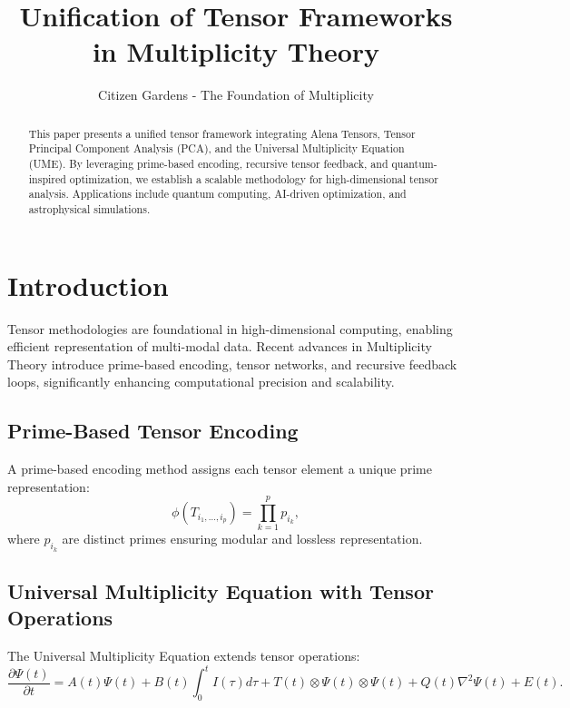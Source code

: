 \documentclass{article}
\theoremstyle{plain}
\begin{document}
\title{Unification of Tensor Frameworks in Multiplicity Theory}

\author{Citizen Gardens - The Foundation of Multiplicity}

\maketitle

\begin{abstract}
This paper presents a unified tensor framework integrating Alena Tensors, Tensor Principal Component Analysis (PCA), and the Universal Multiplicity Equation (UME). By leveraging prime-based encoding, recursive tensor feedback, and quantum-inspired optimization, we establish a scalable methodology for high-dimensional tensor analysis. Applications include quantum computing, AI-driven optimization, and astrophysical simulations.
\end{abstract}

\section{Introduction}
Tensor methodologies are foundational in high-dimensional computing, enabling efficient representation of multi-modal data. Recent advances in Multiplicity Theory introduce prime-based encoding, tensor networks, and recursive feedback loops, significantly enhancing computational precision and scalability.

\subsection{Prime-Based Tensor Encoding}
A prime-based encoding method assigns each tensor element a unique prime representation:
\begin{equation}
\phi(T_{i_1,\dots,i_p}) = \prod_{k=1}^{p} p_{i_k},
\end{equation}
where $p_{i_k}$ are distinct primes ensuring modular and lossless representation.

\subsection{Universal Multiplicity Equation with Tensor Operations}
The Universal Multiplicity Equation extends tensor operations:
\begin{equation}
\frac{\partial \Psi(t)}{\partial t} = A(t) \Psi(t) + B(t) \int_{0}^{t} I(\tau) d\tau + T (t) \otimes \Psi(t) \otimes \Psi(t) + Q(t) \nabla^2 \Psi(t) + E(t).
\end{equation}
\end{document}
